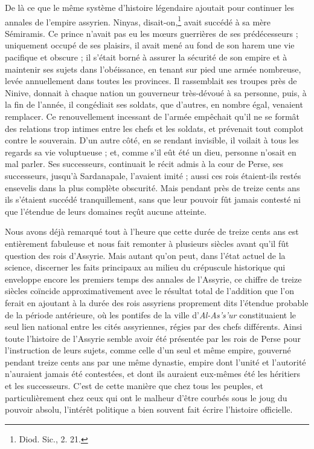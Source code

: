 \documentclass[a4paper, 11pt, oneside, landscape]{article}
\begin{document}
De là ce que le même système d'histoire légendaire ajoutait pour continuer les annales de l'empire assyrien. Ninyas, disait-on,\footnote{Diod. Sic., 2. 21.} avait succédé à sa mère Sémiramis. Ce prince n'avait pas eu les mœurs guerrières de ses prédécesseurs ; uniquement occupé de ses plaisirs, il avait mené au fond de son harem une vie pacifique et obscure ; il s'était borné à assurer la sécurité de son empire et à maintenir ses sujets dans l'obéissance, en tenant sur pied une armée nombreuse, levée annuellement dans toutes les provinces. Il rassemblait ses troupes près de Ninive, donnait à chaque nation un gouverneur très-dévoué à sa personne, puis, à la fin de l'année, il congédiait ses soldats, que d'autres, en nombre égal, venaient remplacer. Ce renouvellement incessant de l'armée empêchait qu'il ne se formât des relations trop intimes entre les chefs et les soldats, et prévenait tout complot contre le souverain. D'un autre côté, en se rendant invisible, il voilait à tous les regards sa vie voluptueuse ; et, comme s'il eût été un dieu, personne n'osait en mal parler. Ses successeurs, continuait le récit admis à la cour de Perse, ses successeurs, jusqu'à Sardanapale, l'avaient imité ; aussi ces rois étaient-ils restés ensevelis dans la plus complète obscurité. Mais pendant près de treize cents ans ils s'étaient succédé tranquillement, sans que leur pouvoir fût jamais contesté ni que l'étendue de leurs domaines reçût aucune atteinte.

Nous avons déjà remarqué tout à l'heure que cette durée de treize cents ans est entièrement fabuleuse et nous fait remonter à plusieurs siècles avant qu'il fût question des rois d'Assyrie. Mais autant qu'on peut, dans l'état actuel de la science, discerner les faits principaux au milieu du crépuscule historique qui enveloppe encore les premiers temps des annales de l'Assyrie, ce chiffre de treize siècles coïncide approximativement avec le résultat total de l'addition que l'on ferait en ajoutant à la durée des rois assyriens proprement dits l'étendue probable de la période antérieure, où les pontifes de la ville d'\emph{Al-As's'ur} constituaient le seul lien national entre les cités assyriennes, régies par des chefs différents. Ainsi toute l'histoire de l'Assyrie semble avoir été présentée par les rois de Perse pour l'instruction de leurs sujets, comme celle d'un seul et même empire, gouverné pendant treize cents ans par une même dynastie, empire dont l'unité et l'autorité n'auraient jamais été contestées, et dont ils auraient eux-mêmes été les héritiers et les successeurs. C'est de cette manière que chez tous les peuples, et particulièrement chez ceux qui ont le malheur d'être courbés sous le joug du pouvoir absolu, l'intérêt politique a bien souvent fait écrire l'histoire officielle.
\end{document}
